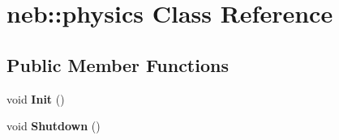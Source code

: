 \hypertarget{classneb_1_1physics}{\section{neb\-:\-:physics \-Class \-Reference}
\label{classneb_1_1physics}
}
\subsection*{\-Public \-Member \-Functions}
\begin{DoxyCompactItemize}
\item 
\hypertarget{classneb_1_1physics_a43cb026789894c6dda3657f83a2cb8d1}{void {\bfseries \-Init} ()}\label{classneb_1_1physics_a43cb026789894c6dda3657f83a2cb8d1}

\item 
\hypertarget{classneb_1_1physics_a24efe8826dbb2b6fa42ee21360123834}{void {\bfseries \-Shutdown} ()}\label{classneb_1_1physics_a24efe8826dbb2b6fa42ee21360123834}

\end{DoxyCompactItemize}
